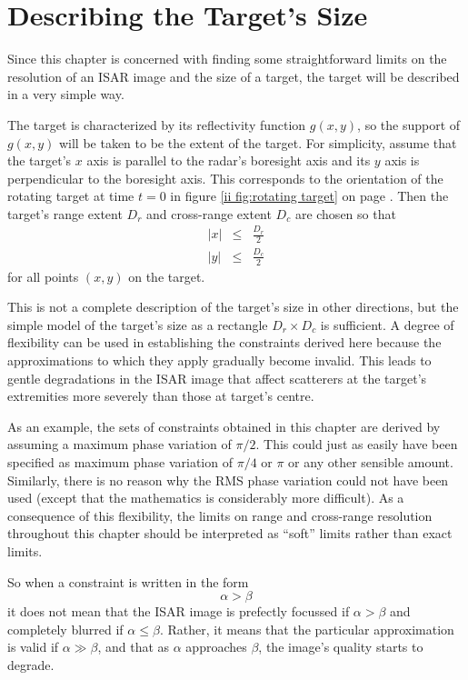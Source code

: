 \section{Describing the Target's Size}

Since this chapter is concerned with finding some straightforward limits on
the resolution of an ISAR image and the size of a target, the target will be
described in a very simple way.  

The target is characterized by its reflectivity function $g(x,y)$, so the 
support of $g(x,y)$ will be taken to be the extent of the target.  For
simplicity, assume that the target's $x$ axis is parallel to the
radar's boresight axis and its $y$ axis is perpendicular to the boresight
axis.  This corresponds to the orientation of the rotating target at time
$t=0$ in figure \ref{ii fig:rotating target} on page \pageref{ii fig:rotating target}.  
Then the target's range extent $D_r$ and cross-range extent $D_c$ are chosen 
so that
\begin{eqnarray}
\left|x\right|&\leq&\frac{D_r}{2}	\label{rmc eqn:dr}\\
\left|y\right|&\leq&\frac{D_c}{2}	\label{rmc eqn:dc}
\end{eqnarray}
for all points $(x,y)$ on the target.

This is not a complete description of the target's size in other directions,
but the simple model of the target's size as a rectangle $D_r\times D_c$ is
sufficient.  A degree of flexibility can be used in establishing the
constraints derived here because the approximations to which they apply 
gradually become invalid.  This leads to gentle degradations in the ISAR
image that affect scatterers at the target's extremities more severely than
those at target's centre.

As an example, the sets of constraints obtained in this chapter are
derived by assuming a maximum phase variation of $\pi/2$.  This could just
as easily have been specified as maximum phase variation of $\pi/4$ or
$\pi$ or any other sensible amount.  Similarly, there is no reason why the
RMS phase variation could not have been used (except that the mathematics is
considerably more difficult).  As a consequence of this flexibility, the
limits on range and cross-range resolution throughout this chapter should be
interpreted as ``soft'' limits rather than exact limits.

So when a constraint is written in the form
\begin{equation}
\alpha>\beta
\end{equation}
it does not mean that the ISAR image is prefectly focussed if $\alpha>\beta$ 
and completely blurred 
if $\alpha\leq\beta$.  Rather, it means that the particular approximation 
is valid if $\alpha\gg\beta$, and that as $\alpha$ approaches $\beta$, the
image's quality starts to degrade.

